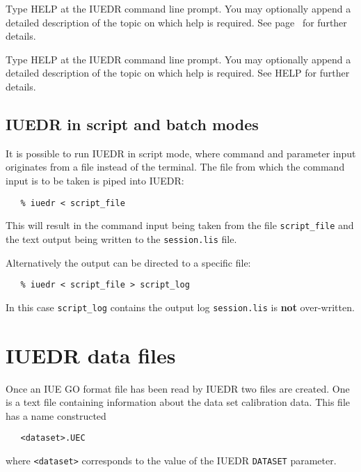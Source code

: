 \begin{latexonly}
Type HELP at the IUEDR command line prompt.
You may optionally append a detailed description of the topic on which help
is required. See page~\pageref{com: HELP } for further details.
\end{latexonly}

\begin{htmlonly}
Type HELP at the IUEDR command line prompt.
You may optionally append a detailed description of the topic on which help
is required. See HELP for further details.
\end{htmlonly}

\subsection {IUEDR in script and batch modes}

It is possible to run IUEDR in script mode, where command and
parameter input originates from a file instead of the terminal.
The file from which the command input is to be taken is piped into IUEDR:

\begin{verbatim}
   % iuedr < script_file
\end{verbatim}

This will result in the command input being taken from the file
\verb+script_file+ and the text output being written to the \verb+session.lis+
file.

Alternatively the output can be directed to a specific file:

\begin{verbatim}
   % iuedr < script_file > script_log
\end{verbatim}

In this case \verb+script_log+ contains the output log \verb+session.lis+ is
{\bf not} over-written.

\newpage
\section{IUEDR data files}

Once an IUE GO format file has been read by IUEDR two files are created.  One
is a text file containing information about the data set calibration data.
This file has a name constructed
\begin{verbatim}
   <dataset>.UEC
\end{verbatim}
where \verb+<dataset>+ corresponds to the value of the IUEDR \verb+DATASET+
parameter.

